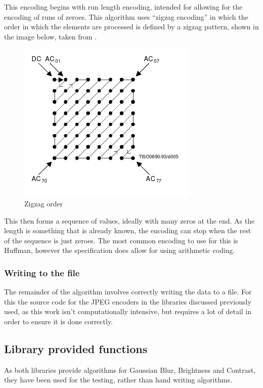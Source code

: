 \documentclass[12pt,a4paper]{article}
\begin{document}
This encoding begins with run length encoding, intended for allowing for the encoding of runs of zeroes. This algorithm uses “zigzag encoding” in which the order in which the elements are processed is defined by a zigzag pattern, shown in the image below, taken from \cite{jpeg}.

\begin{figure}[H]
    \centering
    \includegraphics{zigzag.png}
    \caption{Zigzag order}
\end{figure}

This then forms a sequence of values, ideally with many zeros at the end. As the length is something that is already known, the encoding can stop when the rest of the sequence is just zeroes. The most common encoding to use for this is Huffman, however the specification does allow for using arithmetic coding.

\subsubsection{Writing to the file}

The remainder of the algorithm involves correctly writing the data to a file. For this the source code for the JPEG encoders in the libraries discussed previously used, as this work isn't computationally intensive, but requires a lot of detail in order to ensure it is done correctly.

\subsection{Library provided functions}

As both libraries provide algorithms for Gaussian Blur, Brightness and Contrast, they have been used for the testing, rather than hand writing algorithms.
\end{document}
